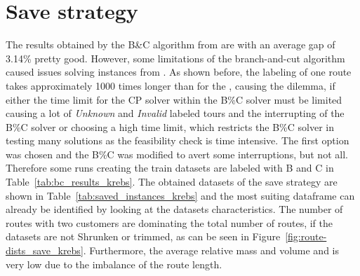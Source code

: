 \section{Save strategy}
\label{sec:challenges_krebs_save}

The results obtained by the B\&C algorithm from \cite{tamke_branch-and-cut_2024} are with an average gap of 3.14\% pretty good. However, some limitations
of the branch-and-cut algorithm caused issues solving instances from \krebsADataSet. As shown before, the labeling of one route takes approximately
1000 times longer than for the \gendreauDataSet, causing the dilemma, if either the time limit for the \gls{CP} solver within the B\%C solver
must be limited causing a lot of \textit{Unknown} and \textit{Invalid} labeled tours and the interrupting of the B\%C solver or choosing
a high time limit, which restricts the B\%C solver in testing many solutions as the feasibility check is time intensive. The first option
was chosen and the B\%C was modified to avert some interruptions, but not all. Therefore some runs creating the train datasets are labeled with
B and C in Table~\ref{tab:bc_results_krebs}. The obtained datasets of the save strategy are shown in Table~\ref{tab:saved_instances_krebs}
and the most suiting dataframe can already be identified by looking at the datasets characteristics. The number of routes with two customers
are dominating the total number of routes, if the datasets are not Shrunken or trimmed, as can be seen in Figure~\ref{fig:route-dists_save_krebs}. Furthermore, the average relative mass and volume and
is very low due to the imbalance of the route length.

